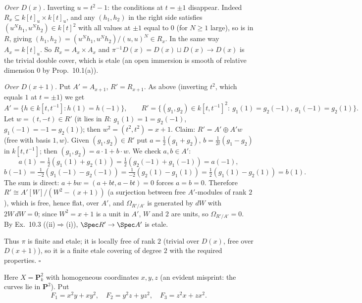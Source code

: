\documentclass[11pt]{article}
\begin{document}
\emph{Over $D(x)$.} Inverting $u=t^2-1$: the conditions at $t=\pm1$ disappear. Indeed $R_x\subseteq k[t]_u\times k[t]_u$, and any $(h_1,h_2)$ in the right side satisfies $(u^Nh_1,u^Nh_2)\in k[t]^2$ with all values at $\pm1$ equal to $0$ (for $N\ge1$ large), so is in $R$, giving $(h_1,h_2)=(u^Nh_1,u^Nh_2)/(u,u)^N\in R_x$. In the same way $A_x=k[t]_u$. So $R_x=A_x\times A_x$ and $\pi^{-1}D(x)=D(x)\sqcup D(x)\to D(x)$ is the trivial double cover, which is etale (an open immersion is smooth of relative dimension $0$ by Prop.~10.1(a)).

\emph{Over $D(x+1)$.} Put $A'=A_{x+1}$, $R'=R_{x+1}$. As above (inverting $t^2$, which equals $1$ at $t=\pm1$) we get
\[
A'=\{h\in k[t,t^{-1}]:h(1)=h(-1)\},\qquad R'=\{(g_1,g_2)\in k[t,t^{-1}]^2:\ g_1(1)=g_2(-1),\ g_1(-1)=g_2(1)\}.
\]
Let $w=(t,-t)\in R'$ (it lies in $R$: $g_1(1)=1=g_2(-1)$, $g_1(-1)=-1=g_2(1)$); then $w^2=(t^2,t^2)=x+1$. Claim: $R'=A'\oplus A'w$ (free with basis $1,w$). Given $(g_1,g_2)\in R'$ put $a=\tfrac12(g_1+g_2)$, $b=\tfrac1{2t}(g_1-g_2)$ in $k[t,t^{-1}]$; then $(g_1,g_2)=a\cdot1+b\cdot w$. We check $a,b\in A'$:
\[
a(1)=\tfrac12(g_1(1)+g_2(1))=\tfrac12(g_2(-1)+g_1(-1))=a(-1),
\]
\[
b(-1)=\tfrac1{-2}(g_1(-1)-g_2(-1))=\tfrac1{-2}(g_2(1)-g_1(1))=\tfrac12(g_1(1)-g_2(1))=b(1).
\]
The sum is direct: $a+bw=(a+bt,a-bt)=0$ forces $a=b=0$. Therefore $R'\cong A'[W]/(W^2-(x+1))$ (a surjection between free $A'$-modules of rank $2$), which is free, hence flat, over $A'$, and $\Omega_{R'/A'}$ is generated by $dW$ with $2W\,dW=0$; since $W^2=x+1$ is a unit in $A'$, $W$ and $2$ are units, so $\Omega_{R'/A'}=0$. By Ex.~10.3 ((ii)$\Rightarrow$(i)), $\Spec R'\to\Spec A'$ is etale.

Thus $\pi$ is finite and etale; it is locally free of rank $2$ (trivial over $D(x)$, free over $D(x+1)$), so it is a finite etale covering of degree $2$ with the required properties. \hfill$\square$

\pf
Here $X=\mathbf P^2_k$ with homogeneous coordinates $x,y,z$ (an evident misprint: the curves lie in $\mathbf P^2$). Put
\[
F_1=x^2y+xy^2,\quad F_2=y^2z+yz^2,\quad F_3=z^2x+zx^2 .
\]
\end{document}
